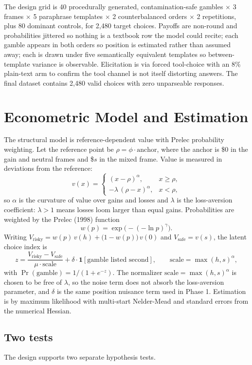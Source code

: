 \documentclass[11pt]{article}
\begin{document}
The design grid is 40 procedurally generated, contamination-safe gambles $\times$ 3 frames $\times$ 5
paraphrase templates $\times$ 2 counterbalanced orders $\times$ 2 repetitions, plus 80 dominant
controls, for 2{,}480 target choices. Payoffs are non-round and probabilities jittered so nothing is a
textbook row the model could recite; each gamble appears in both orders so position is estimated rather
than assumed away; each is drawn under five semantically equivalent templates so between-template
variance is observable. Elicitation is via forced tool-choice with an 8\% plain-text arm to confirm the
tool channel is not itself distorting answers. The final dataset contains 2{,}480 valid choices with
zero unparseable responses.

\section{Econometric Model and Estimation}

The structural model is reference-dependent value with Prelec probability weighting. Let the reference
point be $\rho = \phi \cdot \text{anchor}$, where the anchor is \$0 in the gain and neutral frames and
\$$s$ in the mixed frame. Value is measured in deviations from the reference:
\[
  v(x) =
  \begin{cases}
    (x - \rho)^{\alpha}, & x \ge \rho, \\[2pt]
    -\lambda\,(\rho - x)^{\alpha}, & x < \rho,
  \end{cases}
\]
so $\alpha$ is the curvature of value over gains and losses and $\lambda$ is the loss-aversion
coefficient: $\lambda > 1$ means losses loom larger than equal gains. Probabilities are weighted by the
Prelec (1998) function
\[
  w(p) = \exp\!\big(-(-\ln p)^{\gamma}\big).
\]
Writing $V_{\text{risky}} = w(p)\,v(h) + \big(1 - w(p)\big)\,v(0)$ and $V_{\text{safe}} = v(s)$, the
latent choice index is
\[
  z = \frac{V_{\text{risky}} - V_{\text{safe}}}{\mu \cdot \text{scale}}
      + \delta\cdot\mathbf{1}[\text{gamble listed second}],
  \qquad \text{scale} = \max(h,s)^{\alpha},
\]
with $\Pr(\text{gamble}) = 1/(1 + e^{-z})$. The normalizer $\text{scale} = \max(h,s)^{\alpha}$ is chosen
to be free of $\lambda$, so the noise term does not absorb the loss-aversion parameter, and $\delta$ is
the same position nuisance term used in Phase 1. Estimation is by maximum likelihood with multi-start
Nelder-Mead and standard errors from the numerical Hessian.

\subsection{Two tests}
The design supports two separate hypothesis tests.
\end{document}
